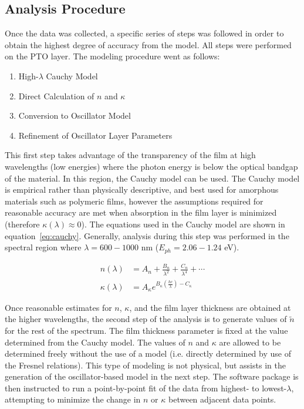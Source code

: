 
\subsection{Analysis Procedure}
\label{chap:Methods-Ellip-Analysis}

Once the data was collected, a specific series of steps was followed in order to obtain the highest degree of accuracy from the model. All steps were performed on the PTO layer. The modeling procedure went as follows:

\begin{enumerate}
\item
High-$\lambda$ Cauchy Model
\item
Direct Calculation of $n$ and $\kappa$
\item
Conversion to Oscillator Model
\item
Refinement of Oscillator Layer Parameters
\end{enumerate}

This first step takes advantage of the transparency of the film at high wavelengths (low energies) where the photon energy is below the optical bandgap of the material. In this region, the Cauchy model can be used. The Cauchy model is empirical rather than physically descriptive, and best used for amorphous materials such as polymeric films, however the assumptions required for reasonable accuracy are met when absorption in the film layer is minimized (therefore $\kappa(\lambda)\approx0$). The equations used in the Cauchy model are shown in equation~\vref{eq:cauchy}. Generally, analysis during this step was performed in the spectral region where $\lambda = 600-1000$ nm ($E_{ph} = 2.06-1.24$ eV). 

\begin{subequations}
\label{eq:cauchy}
\begin{align}
	n\left(\lambda\right) &= A_{n} + \frac{B_{n}}{\lambda^{2}}+\frac{C_{n}}{\lambda^{4}}+\cdots\\
        	\kappa\left(\lambda\right) &= A_{\kappa}e^{B_{\kappa}\left(\frac{hc}{\lambda}\right)-C_{\kappa}}
\end{align}
\end{subequations}

Once reasonable estimates for $n$, $\kappa$, and the film layer thickness are obtained at the higher wavelengths, the second step of the analysis is to generate values of $\tilde{n}$ for the rest of the spectrum. The film thickness parameter is fixed at the value determined from the Cauchy model. The values of $n$ and $\kappa$ are allowed to be determined freely without the use of a model (i.e. directly determined by use of the Fresnel relations). This type of modeling is not physical, but assists in the generation of the oscillator-based model in the next step. The software package is then instructed to run a point-by-point fit of the data from highest- to lowest-$\lambda$, attempting to minimize the change in $n$ or $\kappa$ between adjacent data points. 

